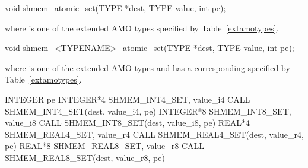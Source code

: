 
\begin{apidefinition}

\begin{C11synopsis}
void shmem_atomic_set(TYPE *dest, TYPE value, int pe);
\end{C11synopsis}
where \TYPE{} is one of the extended \ac{AMO} types specified by
Table~\ref{extamotypes}.

\begin{Csynopsis}
void shmem_<TYPENAME>_atomic_set(TYPE *dest, TYPE value, int pe);
\end{Csynopsis}
where \TYPE{} is one of the extended \ac{AMO} types and has a corresponding
\TYPENAME{} specified by Table~\ref{extamotypes}.

\begin{Fsynopsis}
INTEGER pe
INTEGER*4 SHMEM_INT4_SET, value_i4
CALL SHMEM_INT4_SET(dest, value_i4, pe)
INTEGER*8 SHMEM_INT8_SET, value_i8
CALL SHMEM_INT8_SET(dest, value_i8, pe)
REAL*4 SHMEM_REAL4_SET, value_r4
CALL SHMEM_REAL4_SET(dest, value_r4, pe)
REAL*8 SHMEM_REAL8_SET, value_r8
CALL SHMEM_REAL8_SET(dest, value_r8, pe)
\end{Fsynopsis}

\begin{apiarguments}


\end{apiarguments}




\end{apidefinition}

